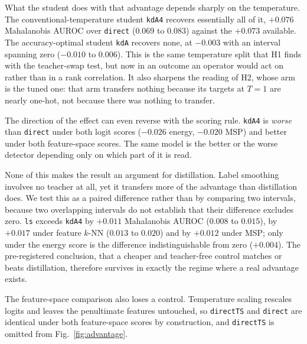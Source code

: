 \documentclass[journal]{IEEEtran}
\newcommand{\kd}[1]{\texttt{#1}}
\begin{document}
What the student does with that advantage depends sharply on the temperature. The conventional-temperature student \kd{kdA4} recovers essentially all of it, $+0.076$ Mahalanobis AUROC over \kd{direct} ($0.069$ to $0.083$) against the $+0.073$ available. The accuracy-optimal student \kd{kdA} recovers none, at $-0.003$ with an interval spanning zero ($-0.010$ to $0.006$). This is the same temperature split that H1 finds with the teacher-swap test, but now in an outcome an operator would act on rather than in a rank correlation. It also sharpens the reading of H2, whose arm is the tuned one: that arm transfers nothing because its targets at $T=1$ are nearly one-hot, not because there was nothing to transfer.

The direction of the effect can even reverse with the scoring rule. \kd{kdA4} is \emph{worse} than \kd{direct} under both logit scores ($-0.026$ energy, $-0.020$ MSP) and better under both feature-space scores. The same model is the better or the worse detector depending only on which part of it is read.

None of this makes the result an argument for distillation. Label smoothing involves no teacher at all, yet it transfers more of the advantage than distillation does. We test this as a paired difference rather than by comparing two intervals, because two overlapping intervals do not establish that their difference excludes zero. \kd{ls} exceeds \kd{kdA4} by $+0.011$ Mahalanobis AUROC ($0.008$ to $0.015$), by $+0.017$ under feature $k$-NN ($0.013$ to $0.020$) and by $+0.012$ under MSP; only under the energy score is the difference indistinguishable from zero ($+0.004$). The pre-registered conclusion, that a cheaper and teacher-free control matches or beats distillation, therefore survives in exactly the regime where a real advantage exists.

The feature-space comparison also loses a control. Temperature scaling rescales logits and leaves the penultimate features untouched, so \kd{directTS} and \kd{direct} are identical under both feature-space scores by construction, and \kd{directTS} is omitted from Fig.~\ref{fig:advantage}.
\end{document}
